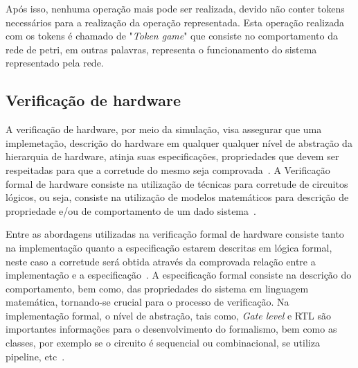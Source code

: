 \par
Após isso, nenhuma operação mais pode ser realizada, devido não conter tokens necessários para a realização da operação representada\cite{murata1989petri}. Esta operação realizada com os tokens é chamado de "\textit{Token game}" que consiste no comportamento da rede de petri, em outras palavras, representa o funcionamento do sistema representado pela rede\cite{halder2006}.


\par

\subsection{Verificação de hardware}

A verificação de hardware, por meio da simulação, visa assegurar que uma implemetação, descrição do hardware em qualquer qualquer nível de abstração da hierarquia de hardware, atinja suas especificações, propriedades que devem ser respeitadas para que a corretude do mesmo seja comprovada~\cite{gupta1992formal}. A Verificação formal de hardware consiste na utilização 
de técnicas para corretude de circuitos lógicos, ou seja, consiste na utilização de modelos matemáticos para descrição de propriedade e/ou de comportamento de um dado sistema~\cite{kropf2013introduction}.

\par
Entre as abordagens utilizadas na verificação formal de hardware consiste tanto na implementação quanto a especificação estarem descritas em lógica formal, neste caso a corretude será obtida através da comprovada relação entre a implementação e a especificação~\cite{seger1992introduction}. A especificação formal consiste na descrição do comportamento, bem como, das propriedades do sistema em linguagem matemática, tornando-se crucial para o processo de verificação. Na implementação formal, o nível de abstração, tais como, \textit{Gate level} e RTL são importantes informações para o desenvolvimento do formalismo, bem como as classes, por exemplo se o circuito é sequencial ou combinacional, se utiliza pipeline, etc~\cite{kropf2013introduction}.


